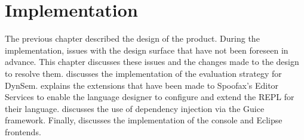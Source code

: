 \chapter{Implementation}
\label{cha:implementation}

The previous chapter described the design of the product. During the
implementation, issues with the design surface that have not been foreseen in
advance. This chapter discusses these issues and the changes made to the design
to resolve them.  discusses the implementation of
the evaluation strategy for DynSem.  explains the
extensions that have been made to Spoofax's Editor Services to enable the
language designer to configure and extend the REPL for their
language.  discusses the use of dependency injection via the
Guice framework. Finally,  discusses the implementation of
the console and Eclipse frontends.









